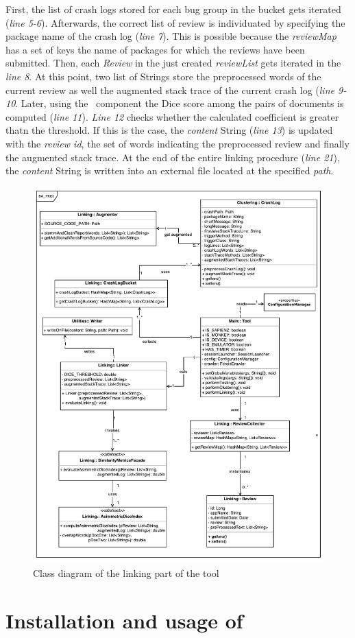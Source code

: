 First, the list of crash logs stored for each bug group in the bucket gets iterated (\textit{line 5-6}). 
Afterwards, the correct list of review is individuated by specifying the package name of the crash log (\textit{line 7}). This is possible because the \textit{reviewMap} has a set of keys the name of packages for which the reviews have been submitted. 
Then, each \textit{Review} in the just created \textit{reviewList} gets iterated in the \textit{line 8}.
At this point, two list of Strings store the preprocessed words of the current review as well the augmented stack trace of the current crash log (\textit{line 9-10}.
Later, using the \Facade\ component the Dice score among the pairs of documents is computed (\textit{line 11}). 
\textit{Line 12} checks whether the calculated coefficient is greater thatn the threshold. 
If this is the case, the \textit{content} String (\textit{line 13}) is updated with 
the \textit{review id}, the set of words indicating the preprocessed review and finally the augmented stack trace. 
At the end of the entire linking procedure (\textit{line 21}), the \textit{content} String is written into an external file located at the specified \textit{path}.

\begin{figure}[t]
\centering 
\includegraphics[width=\columnwidth]{diagrams/linking.pdf} 
\caption{Class diagram of the linking part of the tool }
\label{linking}
\vspace{-3mm} 
\end{figure}


\clearpage
\section{Installation and usage of \toolname}







